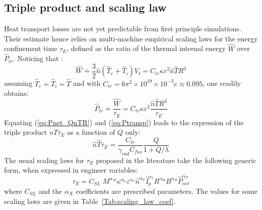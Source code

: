 \documentclass[12pt]{iopart}
\newcommand{\newstuff}[1]{\color{blue}{#1}\color{black}}
\begin{document}
\subsection{Triple product and scaling law} \label{subsec:nTtau}

Heat transport losses are not yet predictable from first principle simulations. Their estimate hence relies on multi-machine empirical scaling laws for the energy confinement time $\tau_E$, defined as the ratio of the thermal internal energy $\widehat W$ over $\widehat P_{tr}$. Noticing that \newstuff{(in [MJ])}:
\begin{equation*}
\widehat W \doteq \frac{3}{2} \widehat n\left( \widehat T_e + \widehat T_i \right ) V_t = C_{tr} \kappa \varepsilon^2  \widehat n \widehat T R^3
\end{equation*}
assuming $\widehat T_e = \widehat T_i = \widehat T$ and with $C_{tr} = 6\pi^2 \times 10^{19} \times 10^{-3}e \approx 0.095$, one readily obtains:
\begin{equation}
	\widehat P_{tr} \doteq \frac{\widehat W}{\tau_E} 
	= C_{tr} \kappa \varepsilon^2  \frac{\widehat n \widehat T R^3}{\tau_E}
\label{eq:Ptransp}
\end{equation}
Equating  (\ref{eq:Pnet_QnTR}) and (\ref{eq:Ptransp}) leads to the expression of the triple product $nT\tau_E$ as a function of $Q$ only:
\begin{equation}
\widehat n \widehat T \tau_E = \frac{C_{tr}}{\gamma_{rad} C_{fus}} \frac{Q}{1+Q/\lambda}
\label{eq:nTtau_Q}
\end{equation}
The usual scaling laws for $\tau_E$ proposed in the literature take the following generic form, when expressed in engineer variables:
\begin{equation}
\label{eq:tauE_SL_generic_a}
\tau_E = C_{SL}\; M^{\alpha_M} \kappa^{\alpha_\kappa} \varepsilon^{\alpha_\epsilon} \widehat n^{\alpha_n} \widehat I_p^{\alpha_I} R^{\alpha_R} B^{\alpha_B} \widehat P_{net}^{\alpha_P}
\end{equation}
where $C_{SL}$ and the $\alpha_X$ coefficients are prescribed parameters. The values for some scaling laws are given in Table~\ref{Tab:scaling_law_coef}.
\end{document}
